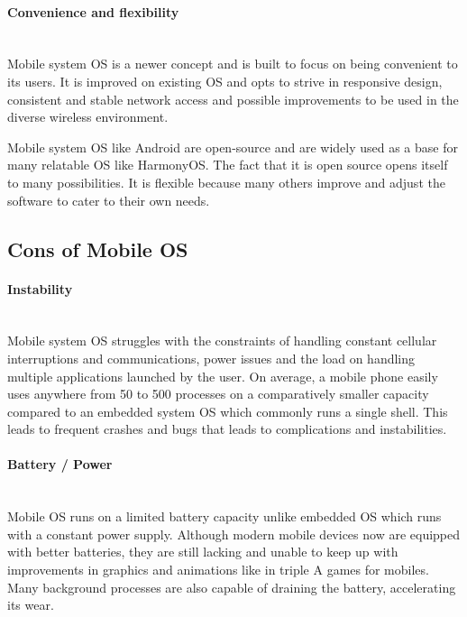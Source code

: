 \documentclass[conference]{IEEEtran}
\newcommand{\forceindent}{\leavevmode{\parindent=1em\indent}}
\begin{document}
\paragraph{Convenience and flexibility} \mbox{} \\
\forceindent Mobile  system OS is a newer concept and is built to focus on being convenient to its users. It is improved on existing OS and opts to strive in responsive design, consistent and stable network access and possible improvements to be used in the diverse wireless environment\cite{technopedia}.

Mobile system OS like Android are open-source and are widely used as a base for many relatable OS like HarmonyOS. The fact that it is open source opens itself to many possibilities. It is flexible because many others improve and adjust the software to cater to their own needs.

\subsection{Cons of Mobile OS}
\paragraph{Instability} \mbox{} \\
\forceindent Mobile system OS struggles with the constraints of handling constant cellular interruptions and communications, power issues and the load on handling multiple applications launched by the user\cite{AAWP}. On average, a mobile phone easily uses anywhere from 50 to 500 processes on a comparatively smaller capacity compared to an embedded system OS which commonly runs a single shell. This leads to frequent crashes and bugs that leads to complications and instabilities.

\paragraph{Battery / Power} \mbox{} \\
\forceindent Mobile OS runs on a limited battery capacity unlike embedded OS which runs with a constant power supply. Although modern mobile devices now are equipped with better batteries, they are still lacking and unable to keep up with improvements in graphics and animations like in triple A games for mobiles. Many background processes are also capable of draining the battery, accelerating its wear.
\end{document}
